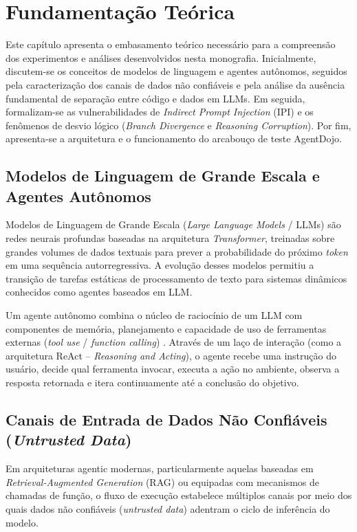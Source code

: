 \chapter{Fundamentação Teórica}\label{chp:FUNDAMENTACAO}

Este capítulo apresenta o embasamento teórico necessário para a compreensão dos experimentos e análises desenvolvidos nesta monografia. Inicialmente, discutem-se os conceitos de modelos de linguagem e agentes autônomos, seguidos pela caracterização dos canais de dados não confiáveis e pela análise da ausência fundamental de separação entre código e dados em LLMs. Em seguida, formalizam-se as vulnerabilidades de \textit{Indirect Prompt Injection} (IPI) e os fenômenos de desvio lógico (\textit{Branch Divergence} e \textit{Reasoning Corruption}). Por fim, apresenta-se a arquitetura e o funcionamento do arcabouço de teste AgentDojo.

\section{Modelos de Linguagem de Grande Escala e Agentes Autônomos}

Modelos de Linguagem de Grande Escala (\textit{Large Language Models} / LLMs) são redes neurais profundas baseadas na arquitetura \textit{Transformer}, treinadas sobre grandes volumes de dados textuais para prever a probabilidade do próximo \textit{token} em uma sequência autorregressiva. A evolução desses modelos permitiu a transição de tarefas estáticas de processamento de texto para sistemas dinâmicos conhecidos como agentes baseados em LLM.

Um agente autônomo combina o núcleo de raciocínio de um LLM com componentes de memória, planejamento e capacidade de uso de ferramentas externas (\textit{tool use} / \textit{function calling}) \cite{debenedetti2024agentdojynamicenvironmentevaluate}. Através de um laço de interação (como a arquitetura ReAct -- \textit{Reasoning and Acting}), o agente recebe uma instrução do usuário, decide qual ferramenta invocar, executa a ação no ambiente, observa a resposta retornada e itera continuamente até a conclusão do objetivo.

\section{Canais de Entrada de Dados Não Confiáveis (\textit{Untrusted Data})}
\label{sec:canais_ataque}

Em arquiteturas agentic modernas, particularmente aquelas baseadas em \textit{Retrieval-Augmented Generation} (RAG) ou equipadas com mecanismos de chamadas de função, o fluxo de execução estabelece múltiplos canais por meio dos quais dados não confiáveis (\textit{untrusted data}) adentram o ciclo de inferência do modelo.

